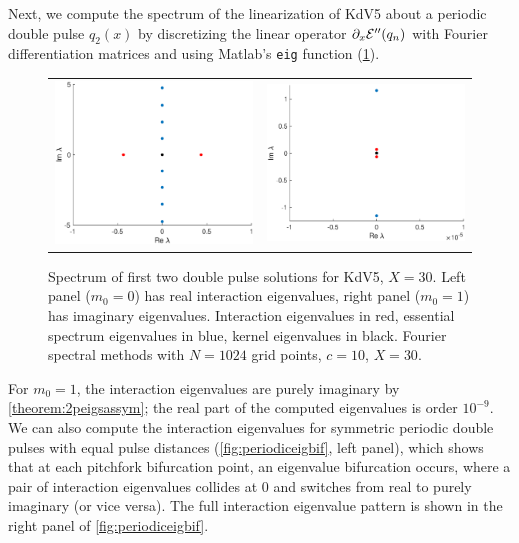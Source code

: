 \documentclass[10pt,reqno]{amsart}
\theoremstyle{plain}
\theoremstyle{definition}
\theoremstyle{remark}
\numberwithin{theorem}{section}
\numberwithin{equation}{section}
\begin{document}
Next, we compute the spectrum of the linearization of KdV5 about a periodic double pulse $q_2(x)$ by discretizing the linear operator $\partial_x \mathcal{E}''(q_n)$ with Fourier differentiation matrices and using Matlab's \texttt{eig} function (\cref{fig:KdV5eigs1}). 
\begin{figure}
\begin{center}
\begin{tabular}{cc}
\includegraphics[width=7.5cm]{images/dp1spec.eps} &
\includegraphics[width=7.5cm]{images/dp2spec.eps}
\end{tabular}
\end{center}
\caption[Spectrum of double pulse solutions]{Spectrum of first two double pulse solutions for KdV5, $X = 30$. Left panel ($m_0 = 0$) has real interaction eigenvalues, right panel ($m_0 = 1$) has imaginary eigenvalues. Interaction eigenvalues in red, essential spectrum eigenvalues in blue, kernel eigenvalues in black. Fourier spectral methods with $N = 1024$ grid points, $c = 10$, $X = 30$.}
\label{fig:KdV5eigs1}
\end{figure}
For $m_0 = 1$, the interaction eigenvalues are purely imaginary by \cref{theorem:2peigsassym};  the real part of the computed eigenvalues is order $10^{-9}$. We can also compute the interaction eigenvalues for symmetric periodic double pulses with equal pulse distances (\cref{fig:periodiceigbif}, left panel), which shows that at each pitchfork bifurcation point, an eigenvalue bifurcation occurs, where a pair of interaction eigenvalues collides at 0 and switches from real to purely imaginary (or vice versa). The full interaction eigenvalue pattern is shown in the right panel of \cref{fig:periodiceigbif}.
\end{document}
